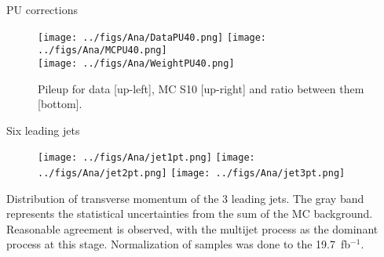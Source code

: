 \begin{frame}{PU corrections}
\vspace{-.2cm}

\begin{figure}[!Hhtbp]
  \begin{center}
    \texttt{[image: ../figs/Ana/DataPU40.png]}
    \texttt{[image: ../figs/Ana/MCPU40.png]}\\
    \texttt{[image: ../figs/Ana/WeightPU40.png]}
    \begin{block}{}
      \tiny \centering Pileup for data [up-left], MC S10 [up-right] and ratio between them [bottom].
    \end{block}
  \end{center}
\end{figure}

\end{frame}

\begin{frame}{Six leading jets \pt}
\vspace{-.2cm}
\begin{figure}[!Hhtbp]
  \begin{center}
    \texttt{[image: ../figs/Ana/jet1pt.png]}
    \texttt{[image: ../figs/Ana/jet2pt.png]}
    \texttt{[image: ../figs/Ana/jet3pt.png]}
  \end{center}
\end{figure}

\vspace{-.2cm}
    \begin{block}{}
      \tiny \centering Distribution of transverse momentum of the 3 leading jets. The gray band represents the statistical uncertainties from the sum of the MC background. Reasonable agreement is observed, with the multijet process as the dominant process at this stage. Normalization of samples was done to the 19.7~fb$^{-1}$.
    \end{block}

\end{frame}

